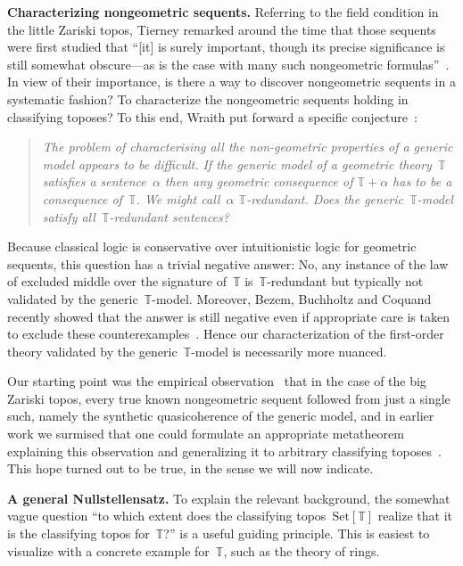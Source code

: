 \documentclass[oneside,reqno]{amsart}
\theoremstyle{definition}
\theoremstyle{plain}
\theoremstyle{remark}
\newcommand{\TT}{\mathbb{T}}
\newcommand{\Set}{\mathrm{Set}}
\renewcommand{\_}{\mathpunct{.}\,}
\newcommand{\?}{\,{:}\,}
\renewcommand{\paragraph}[1]{\noindent\textbf{#1.}}
\begin{document}
\paragraph{Characterizing nongeometric sequents} Referring to the field condition in the little Zariski topos,
Tierney remarked around the time that those sequents were first
studied that ``[it] is surely important, though its precise significance is
still somewhat obscure---as is the case with many such nongeometric
formulas''~\cite[p.~209]{tierney:spectrum}. In view of their importance, is
there a way to discover nongeometric sequents in a systematic fashion? To
characterize the nongeometric sequents holding in classifying toposes? To this
end, Wraith put forward a specific conjecture~\cite[p.~336]{wraith:intuitionistic-algebra}:
\begin{quote}
\emph{The problem of characterising all the non-geometric properties of a generic
model appears to be difficult. If the generic model of a geometric theory~$\TT$
satisfies a sentence~$\alpha$ then any geometric consequence of $\TT + \alpha$ has to be a
consequence of~$\TT$. We might call~$\alpha$ $\TT$-redundant. Does the
generic~$\TT$-model satisfy all~$\TT$-redundant sentences?}
\end{quote}
Because classical logic is conservative over intuitionistic logic for geometric
sequents, this question has a trivial negative answer: No, any instance of the
law of excluded middle over the signature of~$\TT$ is~$\TT$-redundant but
typically not validated by the generic~$\TT$-model. Moreover,
Bezem, Buchholtz and
Coquand recently showed that the answer is still negative even if appropriate
care is taken to exclude these
counterexamples~\cite{bezem-buchholtz-coquand:syntactic-forcing-models}. Hence our
characterization of the first-order theory validated by the generic~$\TT$-model
is necessarily more nuanced.

Our starting point was the empirical
observation~\cite[p.~164]{blechschmidt:phd} that in the case of the big
Zariski topos, every true known nongeometric sequent followed from just a
single such, namely the synthetic quasicoherence of the generic
model, and in earlier work we surmised that one could formulate an appropriate
metatheorem explaining this observation and generalizing it to arbitrary
classifying toposes~\cite[Speculation~22.1]{blechschmidt:phd}. This hope turned
out to be true, in the sense we will now indicate.
\medskip


\paragraph{A general Nullstellensatz} To explain the relevant background, the
somewhat vague question ``to which extent does the classifying
topos~$\Set[\TT]$ realize that it is the classifying topos for~$\TT$?'' is a
useful guiding principle. This is easiest to visualize with a concrete example
for~$\TT$, such as the theory of rings.
\end{document}
